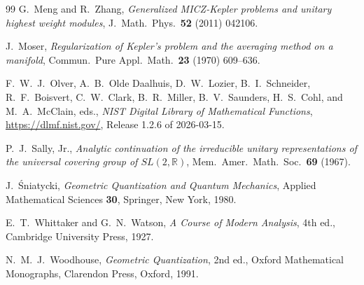 \documentclass[11pt]{article}
\theoremstyle{plain}
\theoremstyle{definition}
\theoremstyle{remark}
\newcommand{\R}{\mathbb{R}}
\begin{document}
\begin{thebibliography}{99}
G.~Meng and R.~Zhang,
\emph{Generalized MICZ-Kepler problems and unitary highest weight modules},
J.~Math.\ Phys.\ \textbf{52} (2011) 042106.

J.~Moser,
\emph{Regularization of Kepler's problem and the averaging method on a manifold},
Commun.\ Pure Appl.\ Math.\ \textbf{23} (1970) 609--636.

F.~W.~J.~Olver, A.~B.~Olde Daalhuis, D.~W.~Lozier, B.~I.~Schneider,
R.~F.~Boisvert, C.~W.~Clark, B.~R.~Miller, B.~V.~Saunders, H.~S.~Cohl,
and M.~A.~McClain, eds.,
\emph{NIST Digital Library of Mathematical Functions},
\url{https://dlmf.nist.gov/}, Release 1.2.6 of 2026-03-15.

P.~J.~Sally, Jr.,
\emph{Analytic continuation of the irreducible unitary representations of the
universal covering group of $SL(2,\R)$},
Mem.\ Amer.\ Math.\ Soc.\ \textbf{69} (1967).

J.~\'{S}niatycki,
\emph{Geometric Quantization and Quantum Mechanics},
Applied Mathematical Sciences \textbf{30}, Springer, New York, 1980.

E.~T.~Whittaker and G.~N.~Watson,
\emph{A Course of Modern Analysis}, 4th ed.,
Cambridge University Press, 1927.

N.~M.~J.~Woodhouse,
\emph{Geometric Quantization},
2nd ed., Oxford Mathematical Monographs, Clarendon Press, Oxford, 1991.

\end{thebibliography}
\end{document}
